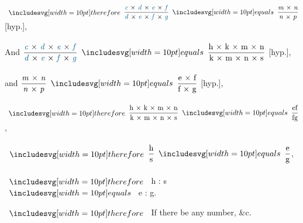 \documentclass[11pt,preview]{standalone}
\begin{document}
\begin{center}
    \begin{onehalfspace}
        $\btherefore \dfrac{\text{\bluec\ × \blued\ × \bluee\ × \bluef}}{\text{\blued\ × \bluee\ × \bluef\ × \blueg}} \bequals \dfrac{\text{\textit{m}\ × \textit{n}}}{\text{\textit{n}\ × \textit{p}}}$ [hyp.],\\
        \hfill\\
        And $\dfrac{\text{\bluec\ × \blued\ × \bluee\ × \bluef}}{\text{\blued\ × \bluee\ × \bluef\ × \blueg}} \bequals \dfrac{\text{h × k × m × n}}{\text{k × m × n × s}}$ [hyp.],\\
        \hfill\\
        and $\dfrac{\text{\textit{m}\ × \textit{n}}}{\text{\textit{n}\ × \textit{p}}} \bequals \dfrac{\text{e × f}}{\text{f × g}}$ [hyp.],\\
        \hfill\\
        $\btherefore \dfrac{\text{h × k × m × n}}{\text{k × m × n × s}} \bequals \dfrac{\text{ef}}{\text{fg}}$,\\
        \hfill\\
        $\btherefore \dfrac{\text{h}}{\text{s}} \bequals \dfrac{\text{e}}{\text{g}}$,\\
        \hfill\\
        $\btherefore$ h : s $\bequals$ e : g.
    \end{onehalfspace}
\end{center}

\hfill

$\btherefore$ If there be any number, \&c.
\end{document}

